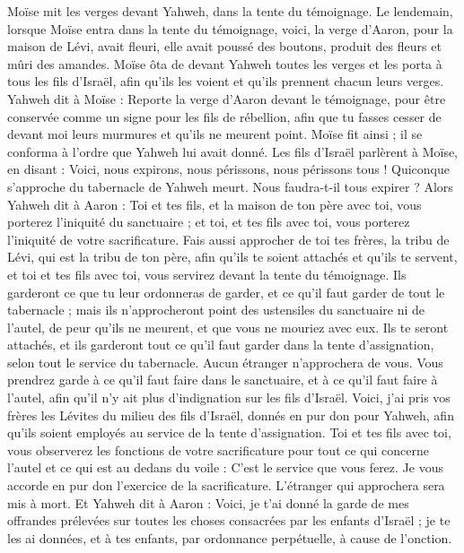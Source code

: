 \begin{multicols}{2}
Moïse mit les verges devant Yahweh, dans la tente du témoignage.
Le lendemain, lorsque Moïse entra dans la tente du témoignage, voici, la verge d'Aaron, pour la maison de Lévi, avait fleuri, elle avait poussé des boutons, produit des fleurs et mûri des amandes.
Moïse ôta de devant Yahweh toutes les verges et les porta à tous les fils d'Israël, afin qu’ils les voient et qu’ils prennent chacun leurs verges.
Yahweh dit à Moïse : Reporte la verge d'Aaron devant le témoignage, pour être conservée comme un signe pour les fils de rébellion, afin que tu fasses cesser de devant moi leurs murmures et qu’ils ne meurent point.
Moïse fit ainsi ; il se conforma à l’ordre que Yahweh lui avait donné.
Les fils d'Israël parlèrent à Moïse, en disant : Voici, nous expirons, nous périssons, nous périssons tous !
Quiconque s'approche du tabernacle de Yahweh meurt. Nous faudra-t-il tous expirer ?
\VerseOne{}Alors Yahweh dit à Aaron : Toi et tes fils, et la maison de ton père avec toi, vous porterez l’iniquité du sanctuaire ; et toi, et tes fils avec toi, vous porterez l’iniquité de votre sacrificature.
Fais aussi approcher de toi tes frères, la tribu de Lévi, qui est la tribu de ton père, afin qu'ils te soient attachés et qu'ils te servent, et toi et tes fils avec toi, vous servirez devant la tente du témoignage.
Ils garderont ce que tu leur ordonneras de garder, et ce qu'il faut garder de tout le tabernacle ; mais ils n'approcheront point des ustensiles du sanctuaire ni de l'autel, de peur qu'ils ne meurent, et que vous ne mouriez avec eux.
Ils te seront attachés, et ils garderont tout ce qu'il faut garder dans la tente d'assignation, selon tout le service du tabernacle. Aucun étranger n'approchera de vous.
Vous prendrez garde à ce qu'il faut faire dans le sanctuaire, et à ce qu'il faut faire à l'autel, afin qu'il n'y ait plus d'indignation sur les fils d'Israël.
Voici, j'ai pris vos frères les Lévites du milieu des fils d'Israël, donnés en pur don pour Yahweh, afin qu'ils soient employés au service de la tente d'assignation.
Toi et tes fils avec toi, vous observerez les fonctions de votre sacrificature pour tout ce qui concerne l'autel et ce qui est au dedans du voile : C’est le service que vous ferez. Je vous accorde en pur don l’exercice de la sacrificature. L’étranger qui approchera sera mis à mort.
Et Yahweh dit à Aaron : Voici, je t'ai donné la garde de mes offrandes prélevées sur toutes les choses consacrées par les enfants d'Israël ; je te les ai données, et à tes enfants, par ordonnance perpétuelle, à cause de l'onction.

\end{multicols}
